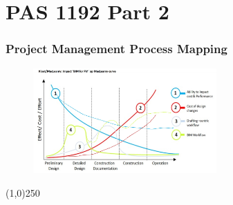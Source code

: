 \section{PAS 1192 Part 2}








\begin{frame}
\frametitle{Project Management Process Mapping}
 \begin{figure}
 	\centering
 		\includegraphics[width = 7cm]{./images/bigKloetMacLeamy.jpg}
 	\label{tbl3-1b}
 \end{figure}
\end{frame}
\begin{center}\line(1,0){250}\end{center}


